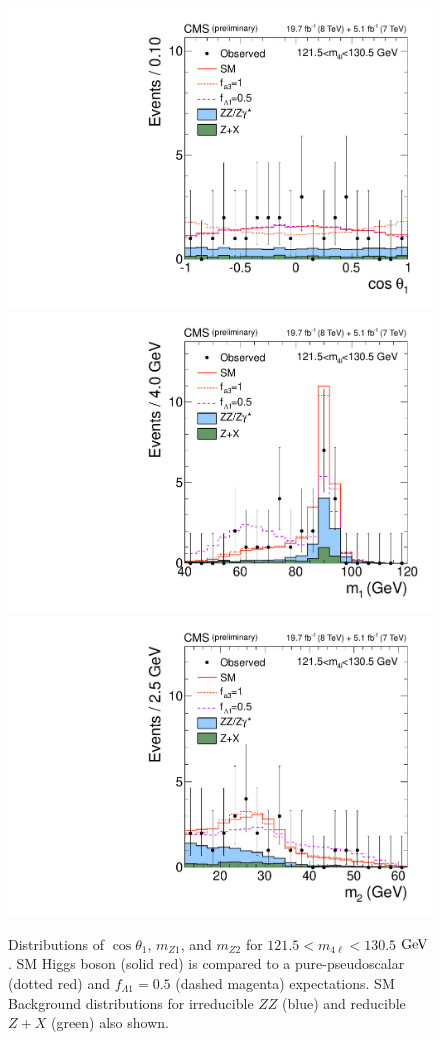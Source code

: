 \begin{figure}[htbp]
\begin{center}
\includegraphics[width=.3\linewidth]{HiggsProperties/figures/cCompare_DataMC_AllTeV_helcosthetaZ1_SignalEnriched.pdf}
\includegraphics[width=.3\linewidth]{HiggsProperties/figures/cCompare_DataMC_AllTeV_Z1Mass_SignalEnriched.pdf}
\includegraphics[width=.3\linewidth]{HiggsProperties/figures/cCompare_DataMC_AllTeV_Z2Mass_SignalEnriched.pdf}
\caption[Kinematic Distributions for SM and Alternative Spin-Parity States near $125.6$ $\rm{GeV}$ Resonance]{Distributions of $\cos\theta_1$, $m_{Z1}$, and $m_{Z2}$ for $121.5<m_{4\ell}<130.5$ $\rm{GeV}$. SM Higgs boson (solid red) is compared to a pure-pseudoscalar (dotted red) and $f_{\Lambda 1}=0.5$ (dashed magenta) expectations. SM Background distributions for irreducible $ZZ$ (blue) and reducible $Z+X$ (green) also shown.}
\label{fig:SPKinDistributions}
\end{center}
\end{figure}

